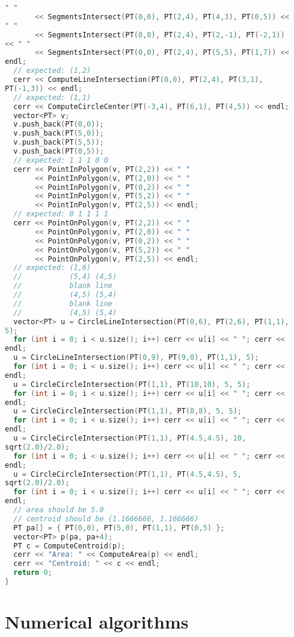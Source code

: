 \begin{lstlisting}[language=C++]
" "
       << SegmentsIntersect(PT(0,0), PT(2,4), PT(4,3), PT(0,5)) << 
" "
       << SegmentsIntersect(PT(0,0), PT(2,4), PT(2,-1), PT(-2,1)) 
<< " "
       << SegmentsIntersect(PT(0,0), PT(2,4), PT(5,5), PT(1,7)) << 
endl;
  // expected: (1,2)
  cerr << ComputeLineIntersection(PT(0,0), PT(2,4), PT(3,1), 
PT(-1,3)) << endl;
  // expected: (1,1)
  cerr << ComputeCircleCenter(PT(-3,4), PT(6,1), PT(4,5)) << endl;
  vector<PT> v; 
  v.push_back(PT(0,0));
  v.push_back(PT(5,0));
  v.push_back(PT(5,5));
  v.push_back(PT(0,5));
  // expected: 1 1 1 0 0
  cerr << PointInPolygon(v, PT(2,2)) << " "
       << PointInPolygon(v, PT(2,0)) << " "
       << PointInPolygon(v, PT(0,2)) << " "
       << PointInPolygon(v, PT(5,2)) << " "
       << PointInPolygon(v, PT(2,5)) << endl;
  // expected: 0 1 1 1 1
  cerr << PointOnPolygon(v, PT(2,2)) << " "
       << PointOnPolygon(v, PT(2,0)) << " "
       << PointOnPolygon(v, PT(0,2)) << " "
       << PointOnPolygon(v, PT(5,2)) << " "
       << PointOnPolygon(v, PT(2,5)) << endl;
  // expected: (1,6)
  //           (5,4) (4,5)
  //           blank line
  //           (4,5) (5,4)
  //           blank line
  //           (4,5) (5,4)
  vector<PT> u = CircleLineIntersection(PT(0,6), PT(2,6), PT(1,1), 
5);
  for (int i = 0; i < u.size(); i++) cerr << u[i] << " "; cerr << 
endl;
  u = CircleLineIntersection(PT(0,9), PT(9,0), PT(1,1), 5);
  for (int i = 0; i < u.size(); i++) cerr << u[i] << " "; cerr << 
endl;
  u = CircleCircleIntersection(PT(1,1), PT(10,10), 5, 5);
  for (int i = 0; i < u.size(); i++) cerr << u[i] << " "; cerr << 
endl;
  u = CircleCircleIntersection(PT(1,1), PT(8,8), 5, 5);
  for (int i = 0; i < u.size(); i++) cerr << u[i] << " "; cerr << 
endl;
  u = CircleCircleIntersection(PT(1,1), PT(4.5,4.5), 10, 
sqrt(2.0)/2.0);
  for (int i = 0; i < u.size(); i++) cerr << u[i] << " "; cerr << 
endl;
  u = CircleCircleIntersection(PT(1,1), PT(4.5,4.5), 5, 
sqrt(2.0)/2.0);
  for (int i = 0; i < u.size(); i++) cerr << u[i] << " "; cerr << 
endl;
  // area should be 5.0
  // centroid should be (1.1666666, 1.166666)
  PT pa[] = { PT(0,0), PT(5,0), PT(1,1), PT(0,5) };
  vector<PT> p(pa, pa+4);
  PT c = ComputeCentroid(p);
  cerr << "Area: " << ComputeArea(p) << endl;
  cerr << "Centroid: " << c << endl;
  return 0;
}
\end{lstlisting}
\section{Numerical algorithms}
